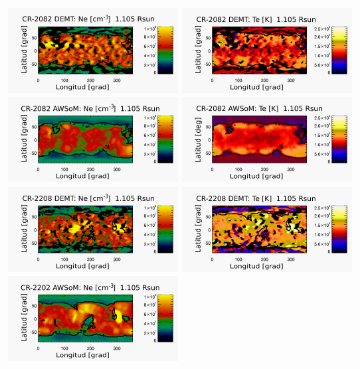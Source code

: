 \documentclass[baaa]{baaa}
\begin{document}
\begin{figure}
  \centering
  \includegraphics[width=0.4\textwidth]{figuras/map_Ne_CR2082_DEMT-EUVI_behind_H1-L3523_r3d_1105_Rsun_2.pdf}
  \includegraphics[width=0.4\textwidth]{figuras/map_Tm_CR2082_DEMT-EUVI_behind_H1-L3523_r3d_1105_Rsun_2.pdf}
  \includegraphics[width=0.4\textwidth]{figuras/map_Ne_awsom_2082_185_short_1105_Rsun_2.pdf}
  \includegraphics[width=0.4\textwidth]{figuras/map_Te_awsom_2082_185_short_1105_Rsun_2.pdf}
  \includegraphics[width=0.4\textwidth]{figuras/map_Ne_CR2208_DEMT-AIA_H1_L522_r3d_1105_Rsun_2.pdf}
  \includegraphics[width=0.4\textwidth]{figuras/map_Tm_CR2208_DEMT-AIA_H1_L522_r3d_1105_Rsun_2.pdf}  
  \includegraphics[width=0.4\textwidth]{figuras/map_Ne_awsom_2208_185_short_1105_Rsun_2.pdf}

\end{figure}
\end{document}
